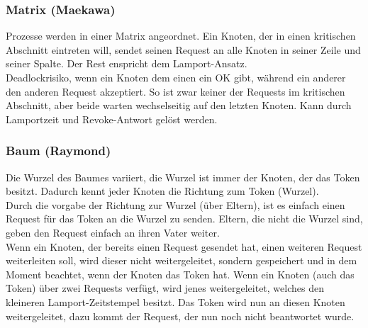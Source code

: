 \documentclass[a4paper]{article}
\begin{document}
\subsubsection{Matrix (Maekawa)}
Prozesse werden in einer Matrix angeordnet. Ein Knoten, der in einen kritischen Abschnitt eintreten will, sendet seinen Request an alle Knoten in seiner Zeile und seiner Spalte. Der Rest enspricht dem Lamport-Ansatz.\\
Deadlockrisiko, wenn ein Knoten dem einen ein OK gibt, während ein anderer den anderen Request akzeptiert. So ist zwar keiner der Requests im kritischen Abschnitt, aber beide warten wechselseitig auf den letzten Knoten. Kann durch Lamportzeit und Revoke-Antwort gelöst werden.\\
\subsubsection{Baum (Raymond)}
Die Wurzel des Baumes variiert, die Wurzel ist immer der Knoten, der das Token besitzt. Dadurch kennt jeder Knoten die Richtung zum Token (Wurzel).\\
Durch die vorgabe der Richtung zur Wurzel (über Eltern), ist es einfach einen Request für das Token an die Wurzel zu senden. Eltern, die nicht die Wurzel sind, geben den Request einfach an ihren Vater weiter.\\
Wenn ein Knoten, der bereits einen Request gesendet hat, einen weiteren Request weiterleiten soll, wird dieser nicht weitergeleitet, sondern gespeichert und in dem Moment beachtet, wenn der Knoten das Token hat. Wenn ein Knoten (auch das Token) über zwei Requests verfügt, wird jenes weitergeleitet, welches den kleineren Lamport-Zeitstempel besitzt. Das Token wird nun an diesen Knoten weitergeleitet, dazu kommt der Request, der nun noch nicht beantwortet wurde.
\end{document}
